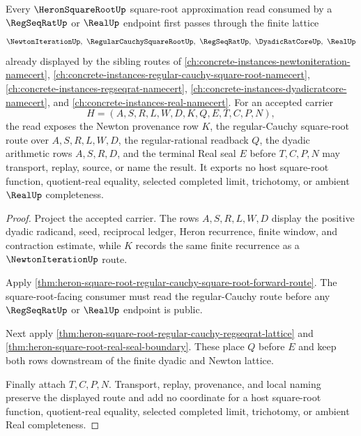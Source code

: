 \begin{theorem}
\label{thm:heron-square-root-real-regseqrat-forward-lattice}
Every $\HeronSquareRootUp$ square-root approximation read consumed by a $\RegSeqRatUp$ or $\RealUp$ endpoint first passes through the finite lattice
$$
\NewtonIterationUp,\ \RegularCauchySquareRootUp,\ \RegSeqRatUp,\ \DyadicRatCoreUp,\ \RealUp
$$
already displayed by the sibling routes of \autoref{ch:concrete-instances-newtoniteration-namecert}, \autoref{ch:concrete-instances-regular-cauchy-square-root-namecert}, \autoref{ch:concrete-instances-regseqrat-namecert}, \autoref{ch:concrete-instances-dyadicratcore-namecert}, and \autoref{ch:concrete-instances-real-namecert}. For an accepted carrier
$$
H=(A,S,R,L,W,D,K,Q,E,T,C,P,N),
$$
the read exposes the Newton provenance row $K$, the regular-Cauchy square-root route over $A,S,R,L,W,D$, the regular-rational readback $Q$, the dyadic arithmetic rows $A,S,R,D$, and the terminal Real seal $E$ before $T,C,P,N$ may transport, replay, source, or name the result. It exports no host square-root function, quotient-real equality, selected completed limit, trichotomy, or ambient $\RealUp$ completeness.
\end{theorem}
\begin{proof}
Project the accepted carrier. The rows $A,S,R,L,W,D$ display the positive dyadic radicand, seed, reciprocal ledger, Heron recurrence, finite window, and contraction estimate, while $K$ records the same finite recurrence as a $\NewtonIterationUp$ route.

Apply \autoref{thm:heron-square-root-regular-cauchy-square-root-forward-route}. The square-root-facing consumer must read the regular-Cauchy route before any $\RegSeqRatUp$ or $\RealUp$ endpoint is public.

Next apply \autoref{thm:heron-square-root-regular-cauchy-regseqrat-lattice} and \autoref{thm:heron-square-root-real-seal-boundary}. These place $Q$ before $E$ and keep both rows downstream of the finite dyadic and Newton lattice.

Finally attach $T,C,P,N$. Transport, replay, provenance, and local naming preserve the displayed route and add no coordinate for a host square-root function, quotient-real equality, selected completed limit, trichotomy, or ambient Real completeness.
\end{proof}
